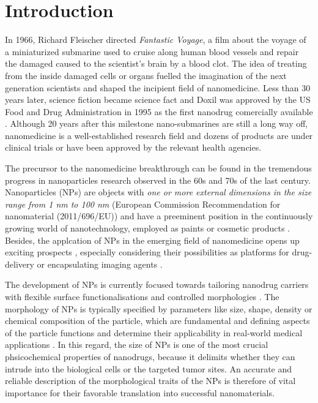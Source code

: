 \chapter{Introduction}
\label{chap:introduction}


In 1966, Richard Fleischer directed \emph{Fantastic Voyage}, a film about the voyage of a miniaturized submarine used to cruise along human blood vessels and repair the damaged caused to the scientist's brain by a blood clot. The idea of treating from the inside damaged cells or organs fuelled the imagination of the next generation scientists and shaped the incipient field of nanomedicine. Less than 30 years later, science fiction became science fact and Doxil was approved by the US Food and Drug Administration in 1995 as the first nanodrug comercially available \citep{barenholz_doxil_2012}. Although 20 years after this milestone nano-submarines are still a long way off, nanomedicine is a well-established research field and dozens of products are under clinical trials or have been approved by the relevant health agencies.

The precursor to the nanomedicine breakthrough can be found in the tremendous progress in nanoparticles research observed in the 60s and 70s of the last century. Nanoparticles (NPs) are objects with \emph{one or more external dimensions in the size range from 1 nm to 100 nm} (European Commission Recommendation for nanomaterial (2011/696/EU)) and have a preeminent position in the continuously growing world of nanotechnology, employed as paints or cosmetic products \citep{guterres_polymeric_2007}. Besides, the applcation of NPs in the emerging field of nanomedicine opens up exciting prospects \citep{nie_nanotechnology_2007, sahoo_nanotech_2003, wickline_nanotechnology_2003, zhou_nano-enabled_2014, rosen_rise_2005}, especially considering their possibilities as platforms for drug-delivery \citep{wang_nanoparticle_2012} or encapsulating imaging agents \citep{tao_shape-specific_2011}.

The development of NPs is currently focused towards tailoring nanodrug carriers with flexible surface functionalisations and controlled morphologies \citep{euliss_imparting_2006,yang_shape-memory_2005}. The morphology of NPs is typically specified by parameters like size, shape, density or chemical composition of the particle, which are fundamental and defining aspects of the particle functions and determine their applicability in real-world medical applications \citep{vittaz_effect_1996}. In this regard, the size of NPs is one of the most crucial phsicochemical properties of nanodrugs, because it delimits whether they can intrude into the biological cells or the targeted tumor sites. An accurate and reliable description of the morphological traits of the NPs is therefore of vital importance for their favorable translation into successful nanomaterials.

